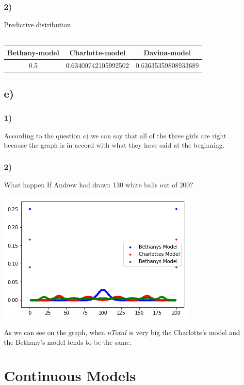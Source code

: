 \documentclass[12pt,twoside]{article}
\begin{document}
\subsubsection*{2)} Predictive distribution \\\\
\begin{tabular}{|c|c|c|}
	\hline 
	Bethany-model & Charlotte-model & Davina-model \\ 
	\hline 
	0.5 & 0.63400742105992502 & 0.63635359808933689 \\ 
	\hline 
\end{tabular} 

\subsection*{e)}
\subsubsection*{1)} According to the question $c)$ we can say that all of the three girls are right because the graph is in accord with what they have said at the beginning.

\subsubsection*{2)} What happen If Andrew had drawn 130 white balls out of 200?\\ 
\begin{center}
	\includegraphics{../index1}     
\end{center}
As we can see on the graph, when $nTotal$ is very big the Charlotte's model and the Bethany's model tends to be the same.


\section{Continuous Models}
\end{document}
